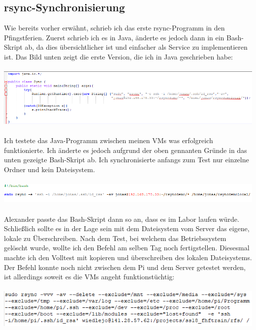 \documentclass{article}
\begin{document}
\subsection{rsync-Synchronisierung}
Wie bereits vorher erwähnt, schrieb ich das erste rsync-Programm in den Pfingstferien. Zuerst schrieb ich es in Java, änderte es jedoch dann in ein Bash-Skript ab, da dies übersichtlicher ist und einfacher als Service zu implementieren ist.
Das Bild unten zeigt die erste Version, die ich in Java geschrieben habe:
\\\\
\includegraphics[width=1.0\textwidth]{JavaPrototype.png}
\\\\
Ich testete das Java-Programm zwischen meinen VMs was erfolgreich funktionierte. Ich änderte es jedoch aufgrund der oben gennanten Gründe in das unten gezeigte Bash-Skript ab. Ich synchronisierte anfangs zum Test nur einzelne Ordner und kein Dateisystem.
\\\\
\includegraphics[width=1.0\textwidth]{syncmasterv1.png}
\\\\
Alexander passte das Bash-Skript dann so an, dass es im Labor laufen würde. Schließlich sollte es in der Lage sein mit dem Dateisystem vom Server das eigene, lokale zu Überschreiben.
Nach dem Test, bei welchem das Betriebssystem gelöscht wurde, wollte ich den Befehl am selben Tag noch fertigstellen. Diesesmal machte ich den Volltest mit kopieren und überschreiben des lokalen Dateisystems.
Der Befehl konnte noch nicht zwischen dem Pi und dem Server getestet werden, ist allerdings soweit es die VMs angeht funktionstüchtig:
\\\\
\includegraphics[width=1.0\textwidth]{skriptv3.png}
\end{document}
